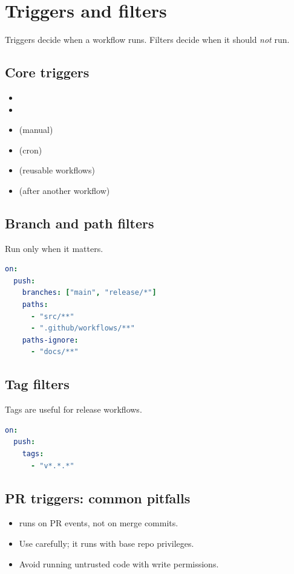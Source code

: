 \chapter{Triggers and filters}

Triggers decide when a workflow runs.
Filters decide when it should \emph{not} run.

\section{Core triggers}
\begin{itemize}[nosep]
  \item {}
  \item {}
  \item {} (manual)
  \item {} (cron)
  \item {} (reusable workflows)
  \item {} (after another workflow)
\end{itemize}

\section{Branch and path filters}
Run only when it matters.

\begin{lstlisting}[language=YAML]
on:
  push:
    branches: ["main", "release/*"]
    paths:
      - "src/**"
      - ".github/workflows/**"
    paths-ignore:
      - "docs/**"
\end{lstlisting}

\section{Tag filters}
Tags are useful for release workflows.

\begin{lstlisting}[language=YAML]
on:
  push:
    tags:
      - "v*.*.*"
\end{lstlisting}

\section{PR triggers: common pitfalls}
\begin{itemize}[nosep]
  \item {} runs on PR events, not on merge commits.
  \item Use  carefully; it runs with base repo privileges.
  \item Avoid running untrusted code with write permissions.
\end{itemize}

